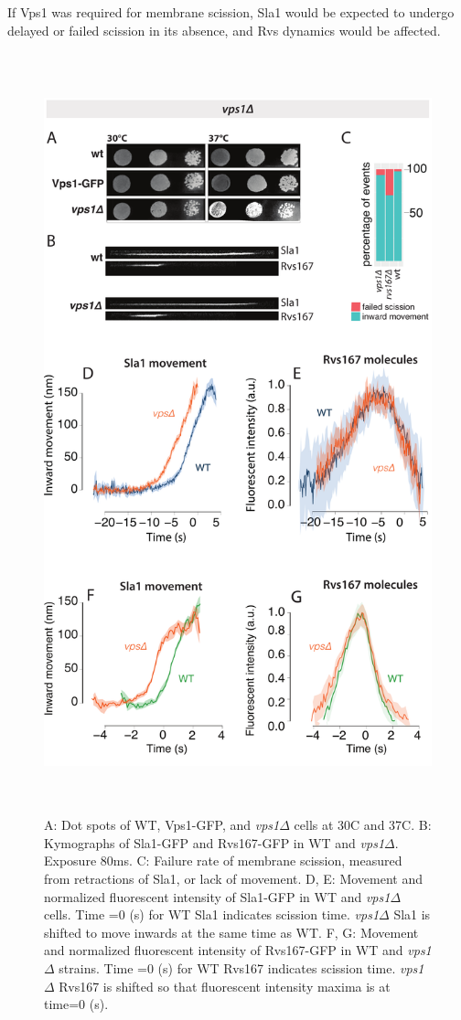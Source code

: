 	\vspace{5mm}
If Vps1 was required for membrane scission, Sla1 would be expected to undergo delayed or failed scission in its absence, and Rvs dynamics would be affected. 

	\begin{figure}
	\centering
	\includegraphics[width=22cm,height=22cm,keepaspectratio]{figures/results_final/vps}
	\caption[Rvs localization in vps deletion]
	{A: Dot spots of WT, Vps1-GFP, and \textit{vps1$\Delta$} cells at 30C and 37C. 
		B: Kymographs of Sla1-GFP and Rvs167-GFP in WT and \textit{vps1$\Delta$}. Exposure 80ms.  
		C: Failure rate of membrane scission, measured from retractions of Sla1, or lack of movement. 
		D, E: Movement and normalized fluorescent intensity of Sla1-GFP in WT and \textit{vps1$\Delta$} cells. Time =0 (s) for WT Sla1 indicates scission time. \textit{vps1$\Delta$} Sla1  is shifted to move inwards at the same time as WT. 
		F, G: Movement and normalized fluorescent intensity of Rvs167-GFP in WT and \textit{vps1$\Delta$} strains. Time =0 (s) for WT Rvs167 indicates scission time. \textit{vps1$\Delta$} Rvs167 is shifted so that fluorescent intensity maxima is at time=0 (s).
		\label{fig4_vpsdel}}
	\end{figure}
	
